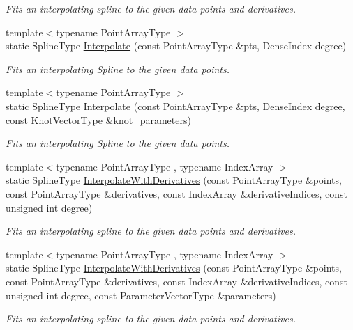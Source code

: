 \begin{DoxyCompactItemize}
\begin{DoxyCompactList}\small\item\em Fits an interpolating spline to the given data points and derivatives. \end{DoxyCompactList}\item 
{\footnotesize template$<$typename Point\+Array\+Type $>$ }\\static Spline\+Type \hyperlink{group___splines___module_aa9bb76fd37d39abc7e465d034719ea0a}{Interpolate} (const Point\+Array\+Type \&pts, Dense\+Index degree)
\begin{DoxyCompactList}\small\item\em Fits an interpolating \hyperlink{group___splines___module_class_eigen_1_1_spline}{Spline} to the given data points. \end{DoxyCompactList}\item 
{\footnotesize template$<$typename Point\+Array\+Type $>$ }\\static Spline\+Type \hyperlink{group___splines___module_aec649f44ad098f9ca71fe0c95ac02a30}{Interpolate} (const Point\+Array\+Type \&pts, Dense\+Index degree, const Knot\+Vector\+Type \&knot\+\_\+parameters)
\begin{DoxyCompactList}\small\item\em Fits an interpolating \hyperlink{group___splines___module_class_eigen_1_1_spline}{Spline} to the given data points. \end{DoxyCompactList}\item 
{\footnotesize template$<$typename Point\+Array\+Type , typename Index\+Array $>$ }\\static Spline\+Type \hyperlink{group___splines___module_a7973279311830f1fa99277104071f892}{Interpolate\+With\+Derivatives} (const Point\+Array\+Type \&points, const Point\+Array\+Type \&derivatives, const Index\+Array \&derivative\+Indices, const unsigned int degree)
\begin{DoxyCompactList}\small\item\em Fits an interpolating spline to the given data points and derivatives. \end{DoxyCompactList}\item 
{\footnotesize template$<$typename Point\+Array\+Type , typename Index\+Array $>$ }\\static Spline\+Type \hyperlink{group___splines___module_ac3224187ac93e21e7b04cd499c2a1bcd}{Interpolate\+With\+Derivatives} (const Point\+Array\+Type \&points, const Point\+Array\+Type \&derivatives, const Index\+Array \&derivative\+Indices, const unsigned int degree, const Parameter\+Vector\+Type \&parameters)
\begin{DoxyCompactList}\small\item\em Fits an interpolating spline to the given data points and derivatives. \end{DoxyCompactList}\end{DoxyCompactItemize}


